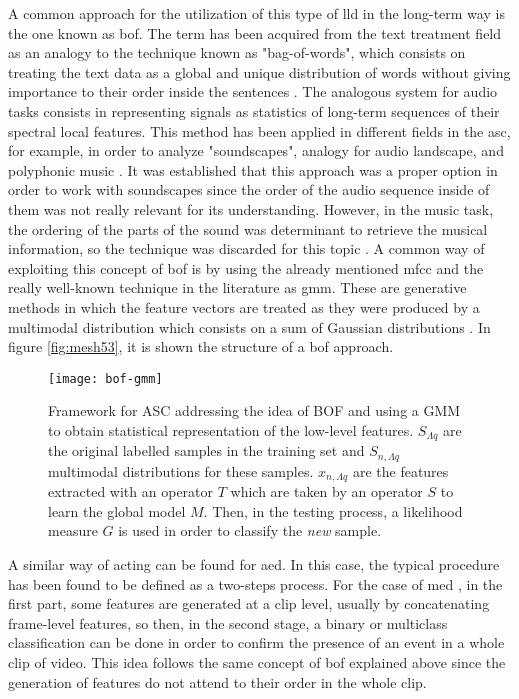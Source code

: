 	A common approach for the utilization of this type of \acrshort{lld} in the long-term way is the one known as \acrfull{bof}. The term has been acquired from the text treatment field as an analogy to the technique known as "bag-of-words", which consists on treating the text data as a global and unique distribution of words without giving importance to their order inside the sentences \cite{Uijlings2009}. The analogous system for audio tasks consists in representing signals as statistics of long-term sequences of their spectral local features. This method has been applied in different fields in the \acrshort{asc}, for example, in order to analyze "soundscapes", analogy for audio landscape, and polyphonic music \cite{Aucouturier2007}. It was established that this approach was a proper option in order to work with soundscapes since the order of the audio sequence inside of them was not really relevant for its understanding. However, in the music task, the ordering of the parts of the sound was determinant to retrieve the musical information, so the technique was discarded for this topic \cite{Aucouturier2009}. A common way of exploiting this concept of \acrshort{bof} is by using the already mentioned \acrshort{mfcc} and the really well-known technique in the literature as \acrshort{gmm}. These are generative methods in which the feature vectors are treated as they were produced by a multimodal distribution which consists on a sum of Gaussian distributions \cite{Barchiesi2015} . In figure \ref{fig:mesh53}, it is shown the structure of a \acrlong{bof} approach. 
	
	\begin{figure}
		\centering
		\captionsetup{justification=centering}
		\texttt{[image: bof-gmm]}
		\caption{Framework for ASC addressing the idea of BOF and using a GMM to obtain statistical representation of the low-level features. $S_{\Lambda q} $ are the original labelled samples in the training set and $S_{n,\Lambda q}$ multimodal distributions for these samples. $x_{n,\Lambda q}$ are the features extracted with an operator $T$ which are taken by an operator $S$ to learn the global model $M$. Then, in the testing process, a likelihood measure $G$ is used in order to classify the \textit{new} sample.}
	\end{figure}
	
	A similar way of acting can be found for \acrshort{aed}. In this case, the typical procedure has been found to be defined as a two-steps process. For the case of \acrfull{med} \cite{Wang2016}, in the first part, some features are generated at a clip level, usually by concatenating frame-level features, so then, in the second stage, a binary or multiclass classification can be done in order to confirm the presence of an event in a whole clip of video. This idea follows the same concept of \acrshort{bof} explained above since the generation of features do not attend to their order in the whole clip.
	
